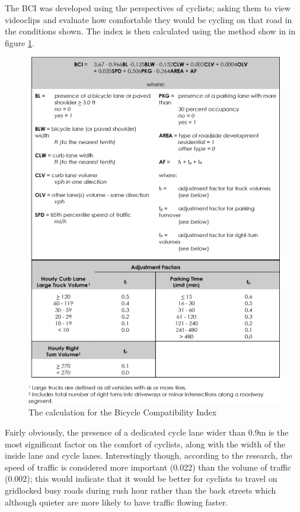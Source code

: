 \documentclass[a4paper]{report}
\begin{document}
{The BCI was developed using the perspectives of cyclists; asking them to view videoclips and evaluate how comfortable they would be cycling on that road in the conditions shown. The index is then calculated using the method show in in figure \ref{fig:bci_calc}.
\begin{figure}[h]
\centering
\includegraphics[scale=0.5]{figures/research_report/bci}
\caption{The calculation for the Bicycle Compatibility Index}
\label{fig:bci_calc}
\end{figure}

Fairly obviously, the presence of a dedicated cycle lane wider than 0.9m is the most significant factor on the comfort of cyclists, along with the width of the inside lane and cycle lanes. Interestingly though, according to the research, the speed of traffic is considered more important (0.022) than the volume of traffic (0.002); this would indicate that it would be better for cyclists to travel on gridlocked busy roads during rush hour rather than the back streets which although quieter are more likely to have traffic flowing faster.

}
\end{document}
